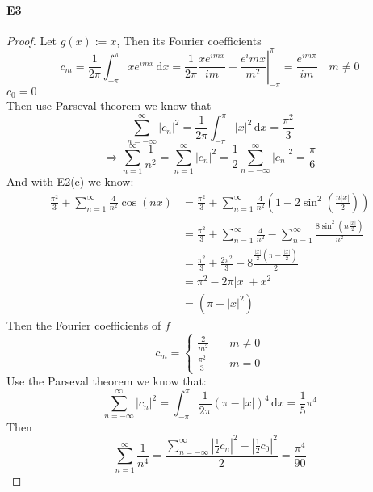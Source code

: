 \documentclass{article}
\begin{document}
\paragraph{E3}
\begin{proof}
    Let  $ g(x):=x $, Then its Fourier coefficients
    \[c_m=\dfrac{1}{2\pi}\int_{-\pi }^{\pi } xe^{imx}\, \mathrm{d}x=\dfrac{1}{2\pi}\left.\dfrac{xe^{imx}}{im}+\dfrac{e^imx }{m^2}\right|_{-\pi}^\pi=\dfrac{e^{im\pi}}{im} \quad m\not=0 \] 
     $ c_0=0 $\\  
    Then use Parseval theorem we know that\[\sum\limits_{n=-\infty }^{\infty } |c_n|^2=\dfrac{1}{2\pi}\int_{-\pi}^{\pi} |x|^2\, \mathrm{d}x=\frac{\pi^2}{3}  \]
    \[\Rightarrow \sum\limits_{n=1}^{\infty} \frac{1}{n^2}=\sum\limits_{n=1}^{\infty} |c_n|^2=\dfrac{1 }{2}\sum\limits_{n=-\infty }^{\infty } |c_n|^2=\frac{\pi}{6}\]
    And with E2(c) we know:
    \begin{align*}
        \frac{\pi^2}{3}+\sum\limits_{n=1}^{\infty} \frac{4}{n^2}\cos(nx)&=\frac{\pi^2}{3}+\sum\limits_{n=1}^{\infty} \frac{4}{n^2}(1-2\sin^2(\frac{n|x|}{2}))\\
        &=\frac{\pi^2}{3}+\sum\limits_{n=1}^{\infty} \frac{4}{n^2}-\sum\limits_{n=1}^{\infty}\frac{8\sin^2(n\frac{|x| }{2})}{n^2}\\
        &= \frac{\pi^2}{3}+\frac{2\pi^2}{3}-8\frac{\frac{|x| }{2 }(\pi-\frac{|x| }{2})}{2}\\
        &=\pi^2-2\pi |x|+x^2\\
        &=(\pi-|x|^2)
    \end{align*}
    Then the Fourier coefficients of  $ f  $ 
    \begin{equation*}
        c_m=\left\{
            \begin{aligned}
                \frac{2 }{m^2}&\quad m\not=0\\
                \frac{\pi^2}{3}&\quad m=0
            \end{aligned}
        \right.
    \end{equation*}
    Use the Parseval theorem we know that:
    \[\sum\limits_{n=-\infty}^{\infty} |c_n|^2=\int_{-\pi }^{\pi }\frac{1}{2\pi} (\pi-|x|)^4\, \mathrm{d}x=\frac{1 }{5}\pi^4  \]
    Then\[\sum\limits_{n=1}^{\infty} \dfrac{1}{n^4}=\dfrac{\sum\limits_{n=-\infty}^{\infty} |\frac{1 }{2}c_n|^2-|\frac{1 }{2}c_0|^2}{2}=\dfrac{\pi^4 }{90}\]
\end{proof}
\end{document}
